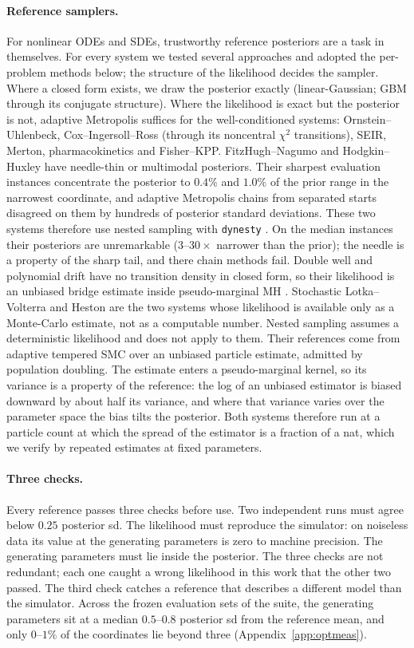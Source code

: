 \documentclass[10pt]{article}
\begin{document}
\paragraph{Reference samplers.} For nonlinear ODEs and SDEs, trustworthy reference posteriors are a
task in themselves. For every system we tested several approaches and adopted the per-problem methods
below; the structure of the likelihood decides the sampler. Where a closed form exists, we draw the
posterior exactly (linear-Gaussian; GBM through its conjugate structure). Where the likelihood is
exact but the posterior is not, adaptive Metropolis suffices for the well-conditioned systems:
Ornstein--Uhlenbeck, Cox--Ingersoll--Ross (through its noncentral $\chi^2$ transitions), SEIR,
Merton, pharmacokinetics and Fisher--KPP. FitzHugh--Nagumo and Hodgkin--Huxley have needle-thin or
multimodal posteriors. Their sharpest evaluation instances concentrate the posterior to $0.4\%$ and
$1.0\%$ of the prior range in the narrowest coordinate, and adaptive Metropolis chains from separated
starts disagreed on them by hundreds of posterior standard deviations. These two systems therefore
use nested sampling with \texttt{dynesty} \citep{skilling2006,speagle2020}. On the median instances
their posteriors are unremarkable ($3$--$30\times$ narrower than the prior); the needle is a property
of the sharp tail, and there chain methods fail. Double well and polynomial drift have no transition
density in closed form, so their likelihood is an unbiased bridge estimate \citep{durham2002} inside
pseudo-marginal MH \citep{andrieu2010}. Stochastic Lotka--Volterra and Heston are the two systems
whose likelihood is available only as a Monte-Carlo estimate, not as a computable number. Nested
sampling assumes a deterministic likelihood and does not apply to them. Their references come from
adaptive tempered SMC \citep{delmoral2006} over an unbiased particle estimate, admitted by population
doubling. The estimate enters a pseudo-marginal kernel, so its variance is a property of the
reference: the log of an unbiased estimator is biased downward by about half its variance, and where
that variance varies over the parameter space the bias tilts the posterior. Both systems therefore
run at a particle count at which the spread of the estimator is a fraction of a nat, which we verify
by repeated estimates at fixed parameters.

\paragraph{Three checks.} Every reference passes three checks before use. Two independent runs must
agree below $0.25$ posterior sd. The likelihood must reproduce the simulator: on noiseless data its
value at the generating parameters is zero to machine precision. The generating parameters must lie
inside the posterior. The three checks are not redundant; each one caught a wrong likelihood in this
work that the other two passed. The third check catches a reference that describes a different model
than the simulator. Across the frozen evaluation sets of the suite, the generating parameters sit at
a median $0.5$--$0.8$ posterior sd from the reference mean, and only $0$--$1\%$ of the coordinates lie
beyond three (Appendix~\ref{app:optmeas}).
\end{document}
